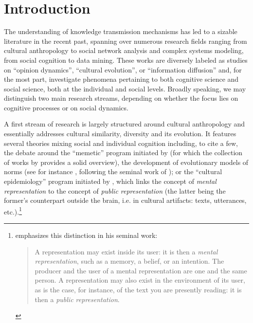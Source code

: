 \section{Introduction} %

The understanding of knowledge transmission mechanisms has led to a sizable literature in the recent past, spanning over numerous research fields ranging from cultural anthropology to social network analysis and complex systems modeling, from social cognition to data mining. These works are diversely labeled as studies on ``opinion dynamics'', ``cultural evolution'', or ``information diffusion'' and, for the most part, 
 investigate phenomena pertaining to both cognitive science and social science, %
 both at the individual and social levels.  Broadly speaking, we may distinguish two main research streams, depending on whether the focus lies on cognitive processes or on social dynamics.


A first stream of research is largely structured around cultural anthropology and essentially addresses cultural similarity, diversity and its evolution. It features several theories mixing social and individual cognition including, to cite a few, the debate around the ``memetic'' program initiated by \citet{Dawkins76} (for which the collection of works by \citet{Aunger00} provides a solid overview), the development of evolutionary models of norms (see for instance \citet{Ehrlich05}, following the seminal work of \citet{Boyd85}); or the ``cultural epidemiology'' program initiated by \citet{sper:expl}, which %
links %
the concept of \emph{mental representation} to the concept of \emph{public representation} (the latter being the former's counterpart outside the brain, i.e. in cultural artifacts: texts, utterances, etc.).\footnote{\citet{sper:expl} emphasizes this distinction in his seminal work:
\begin{quotation}
A representation may exist inside its user: it is then a \emph{mental representation}, such as a memory, a belief, or an intention.
The producer and the user of a mental representation are one and the same person.
A representation may also exist in the environment of its user, as is the case, for instance, of the text you are presently reading: it is then a \emph{public representation}.
\end{quotation}}

